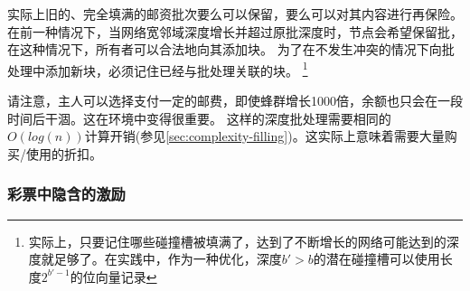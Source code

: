 实际上旧的、完全填满的邮资批次要么可以保留，要么可以对其内容进行再保险。在前一种情况下，当网络宽邻域深度增长并超过原批深度时，节点会希望保留批，在这种情况下，所有者可以合法地向其添加块。
为了在不发生冲突的情况下向批处理中添加新块，必须记住已经与批处理关联的块。%
%
\footnote{实际上，只要记住哪些碰撞槽被填满了，达到了不断增长的网络可能达到的深度就足够了。在实践中，作为一种优化，深度$b' >b$的潜在碰撞槽可以使用长度$2^{b'-1}$的位向量记录}
%

请注意，主人可以选择支付一定的邮费，即使蜂群增长1000倍，余额也只会在一段时间后干涸。这在环境中变得很重要。
这样的深度批处理需要相同的$O(\mathit{log}(n))$计算开销(参见\ref{sec:complexity-filling})。这实际上意味着需要大量购买/使用的折扣。









\subsubsection{彩票中隐含的激励}

